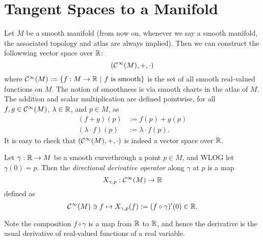 
\section{Tangent Spaces to a Manifold}

Let \(M\) be a smooth manifold (from now on, whenever we say a smooth manifold, the associated topology and atlas are always implied). Then we can construct the followwing vector space over \(\mathbb R\):
\begin{equation}
    \qty(\mathcal C^\infty(M), +, \cdot)
\end{equation}
where \(\mathcal C^\infty(M) := \qty{f : M \to \mathbb R\ \middle|\ f \text{ is smooth}}\) is the set of all smooth real-valued functions on \(M\). The notion of smoothness is via smooth charts in the atlas of \(M\). The addition and scalar multiplication are defined pointwise, for all \(f, g \in \mathcal C^\infty(M)\), \(\lambda \in \mathbb R\), and \(p \in M\), as
\begin{align}
    (f + g)(p)           & := f(p) + g(p)         \\
    (\lambda \cdot f)(p) & := \lambda \cdot f(p).
\end{align}
It is easy to check that \(\qty(\mathcal C^\infty(M), +, \cdot)\) is indeed a vector space over \(\mathbb R\).

\begin{definition}
    Let \(\gamma: \mathbb R \to M\) be a smooth curve\footnotemark through a point \(p \in M\), and WLOG let \(\gamma(0) = p\). Then the \emph{directional derivative operator} along \(\gamma\) at \(p\) is a map
    \begin{equation}
        X_{\gamma, p} : \mathcal C^\infty(M) \to \mathbb R
    \end{equation}
    defined as
    \begin{equation}
        \mathcal C^\infty(M) \ni f \mapsto X_{\gamma, p}(f) := (f \circ \gamma)'(0) \in \mathbb R.
    \end{equation}
\end{definition}
Note the composition \(f \circ \gamma\) is a map from \(\mathbb R\) to \(\mathbb R\), and hence the derivative is the usual derivative of real-valued functions of a real variable.

